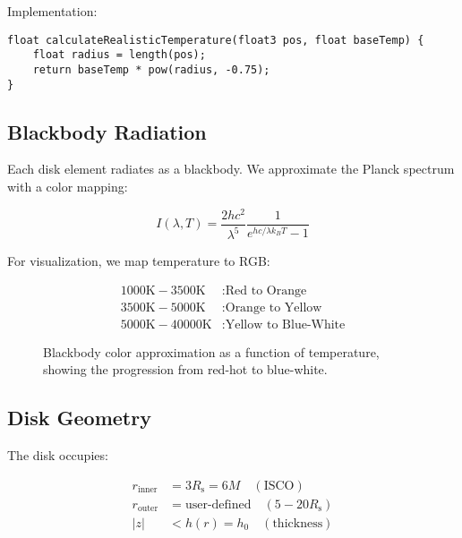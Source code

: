 \documentclass[12pt,a4paper]{article}
\theoremstyle{definition}
\theoremstyle{remark}
\newcommand{\Rs}{R_{\text{s}}}
\begin{document}
Implementation:

\begin{lstlisting}[style=metalstyle, caption=Temperature calculation]
float calculateRealisticTemperature(float3 pos, float baseTemp) {
    float radius = length(pos);
    return baseTemp * pow(radius, -0.75);
}
\end{lstlisting}

\subsection{Blackbody Radiation}

Each disk element radiates as a blackbody. We approximate the Planck spectrum with a color mapping:

\begin{equation}
    I(\lambda, T) = \frac{2hc^2}{\lambda^5}\frac{1}{e^{hc/\lambda k_B T} - 1}
\end{equation}

For visualization, we map temperature to RGB:

\begin{align}
    1000\text{K} - 3500\text{K} &: \text{Red to Orange} \\
    3500\text{K} - 5000\text{K} &: \text{Orange to Yellow} \\
    5000\text{K} - 40000\text{K} &: \text{Yellow to Blue-White}
\end{align}

\begin{figure}[H]
    \centering
    \caption{Blackbody color approximation as a function of temperature, showing the progression from red-hot to blue-white.}
    \label{fig:blackbody_colors}
\end{figure}

\subsection{Disk Geometry}

The disk occupies:

\begin{align}
    r_{\text{inner}} &= 3\Rs = 6M \quad (\text{ISCO}) \\
    r_{\text{outer}} &= \text{user-defined} \quad (5-20\Rs) \\
    |z| &< h(r) = h_0 \quad (\text{thickness})
\end{align}
\end{document}
